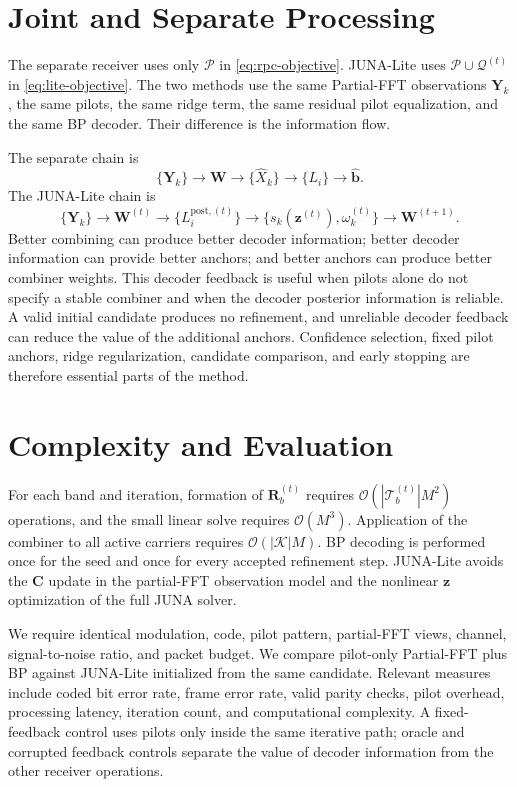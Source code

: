 \documentclass[conference]{IEEEtran}
\newcommand{\Pset}{\mathcal{P}}
\newcommand{\Kset}{\mathcal{K}}
\begin{document}
\section{Joint and Separate Processing}

The separate receiver uses only \(\Pset\) in
\eqref{eq:rpc-objective}.  JUNA-Lite uses
\(\Pset\cup\mathcal Q^{(t)}\) in \eqref{eq:lite-objective}.  The two methods
use the same Partial-FFT observations \(\mathbf Y_k\), the same pilots, the
same ridge term, the same residual pilot equalization, and the same BP decoder.
Their difference is the information flow.

The separate chain is
\[
  \{\mathbf Y_k\}
  \rightarrow
  \mathbf W
  \rightarrow
  \{\widehat X_k\}
  \rightarrow
  \{L_i\}
  \rightarrow
  \widehat{\mathbf b}.
\]
The JUNA-Lite chain is
\[
  \{\mathbf Y_k\}
  \rightarrow
  \mathbf W^{(t)}
  \rightarrow
  \{L_i^{\mathrm{post},(t)}\}
  \rightarrow
  \{s_k(\mathbf z^{(t)}),\omega_k^{(t)}\}
  \rightarrow
  \mathbf W^{(t+1)}.
\]
Better combining can produce better decoder information; better decoder
information can provide better anchors; and better anchors can produce better
combiner weights.  This decoder feedback is useful when pilots alone do not specify
a stable combiner and when the decoder posterior information is reliable.  A
valid initial candidate produces no refinement, and unreliable decoder feedback
can reduce the value of the additional anchors.  Confidence selection, fixed
pilot anchors, ridge regularization, candidate comparison, and early stopping
are therefore essential parts of the method.

\section{Complexity and Evaluation}

For each band and iteration, formation of
\(\mathbf R_b^{(t)}\) requires
\(\mathcal O(|\mathcal T_b^{(t)}|M^2)\) operations, and the small linear solve
requires \(\mathcal O(M^3)\).  Application of the combiner to all active
carriers requires \(\mathcal O(|\Kset|M)\).  BP decoding is performed once for
the seed and once for every accepted refinement step.  JUNA-Lite avoids the
\(\mathbf C\) update in the partial-FFT observation model and the nonlinear
\(\mathbf z\) optimization
of the full JUNA solver.

We require identical modulation, code, pilot pattern,
partial-FFT views, channel, signal-to-noise ratio, and packet budget.  We
compare pilot-only Partial-FFT plus BP against JUNA-Lite
initialized from the same candidate.  Relevant measures include coded bit
error rate, frame error rate, valid parity checks, pilot overhead, processing
latency, iteration count, and computational complexity.  A fixed-feedback
control uses pilots only inside the same iterative path; oracle and corrupted
feedback controls separate the value of decoder information from the other
receiver operations.
\end{document}
